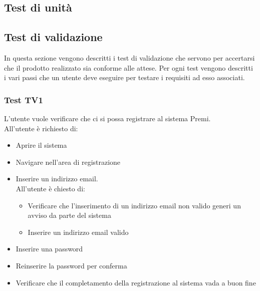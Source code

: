 \subsection {Test di unità}

\subsection {Test di validazione}

In questa sezione vengono descritti i test di validazione che servono per accertarsi che il prodotto realizzato sia conforme alle attese. Per ogni test vengono descritti i vari passi che un utente deve eseguire per testare i requisiti ad esso associati.

\subsubsection {Test TV1} %
L'utente vuole verificare che ci si possa registrare al sistema Premi.\\
All'utente è richiesto di:
\begin{itemize}
	\item Aprire il sistema
	\item Navigare nell'area di registrazione
	\item Inserire un indirizzo email. \\
	         All'utente è chiesto di: 
	         \begin{itemize}
	         	\item Verificare che l'inserimento di un indirizzo email non valido generi un avviso da parte del sistema
	         	\item Inserire un indirizzo email valido
	         \end{itemize}
	\item Inserire una password
	\item Reinserire la password per conferma
	\item Verificare che il completamento della registrazione al sistema vada a buon fine
\end{itemize}

